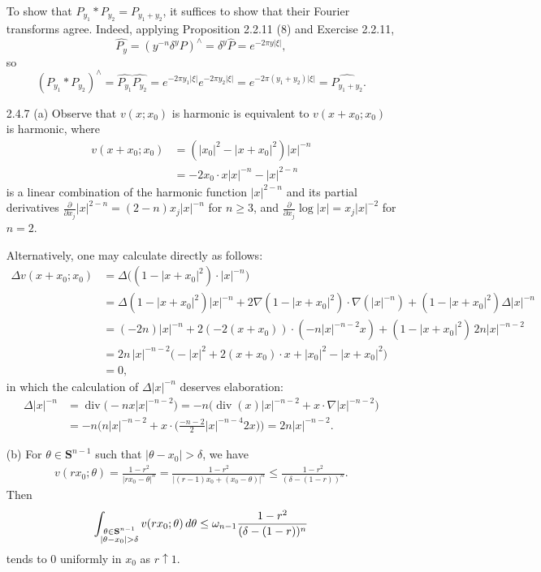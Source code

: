 \begin{itemize}
To show that $P_{y_1}*P_{y_2}=P_{y_1+y_2}$, 
it suffices to show that their Fourier transforms agree. 
Indeed, applying Proposition 2.2.11 (8) and Exercise 2.2.11, 
$$\widehat{P_y}=(y^{-n}\delta^y P)^\wedge=\delta^y \widehat{P}=e^{-2\pi y|\xi|},$$
so
$$(P_{y_1}*P_{y_2})^\wedge=\widehat{P_{y_1}}\widehat{P_{y_2}}
=e^{-2\pi y_1|\xi|}e^{-2\pi y_2|\xi|}=e^{-2\pi (y_1+y_2)|\xi|}
=\widehat{P_{y_1+y_2}}.$$

\item[2.4.7]
(a) Observe that $v(x;x_0)$ is harmonic is equivalent to 
$v(x+x_0;x_0)$ is harmonic, where
\begin{align*}
    v(x+x_0;x_0)&=(|x_0|^2-|x+x_0|^2)|x|^{-n}\\
    &=-2x_0\cdot x|x|^{-n}-|x|^{2-n}
\end{align*}
is a linear combination of the harmonic function $|x|^{2-n}$ and 
its partial derivatives $\frac{\partial}{\partial x_j}|x|^{2-n}=(2-n)x_j|x|^{-n}$ 
for $n\geq3$, and $\frac{\partial}{\partial x_j}\log|x|=x_j|x|^{-2}$ for $n=2$.

Alternatively, one may calculate directly as follows:
\begin{align*}
    \Delta v(x+x_0;x_0)
    &=\Delta\big((1-|x+x_0|^2)\cdot|x|^{-n}\big)\\
    &=\Delta(1-|x+x_0|^2)|x|^{-n}+2\nabla(1-|x+x_0|^2)\cdot\nabla(|x|^{-n})
    +(1-|x+x_0|^2)\Delta|x|^{-n}\\
    &=(-2n)|x|^{-n}+2(-2(x+x_0))\cdot(-n|x|^{-n-2}x)
    +(1-|x+x_0|^2)\,2n|x|^{-n-2}\\
    &=2n\,|x|^{-n-2}\big(\!-|x|^2+2(x+x_0)\cdot x+|x_0|^2-|x+x_0|^2\big)\\
    &=0,
\end{align*}
in which the calculation of $\Delta|x|^{-n}$ deserves elaboration:
\begin{align*}
    \Delta|x|^{-n}
    &=\operatorname{div}\big(\!-\!nx|x|^{-n-2}\big)
    =-n\big(\operatorname{div}(x)|x|^{-n-2}+x\cdot\nabla|x|^{-n-2}\big)\\
    &=-n\Big(n|x|^{-n-2}+x\cdot\Big(\frac{-n-2}{2}|x|^{-n-4}2x\Big)\Big)
    =2n|x|^{-n-2}.
\end{align*}

(b) For $\theta\in\mathbf{S}^{n-1}$ such that $|\theta-x_0|>\delta$, we have
\begin{align*}
    v(rx_0;\theta)=\frac{1-r^2}{|rx_0-\theta|^n}
    =\frac{1-r^2}{|(r-1)x_0+(x_0-\theta)|^n}
    \leq\frac{1-r^2}{(\delta-(1-r))^n}.
\end{align*}
Then
\begin{align*}
\int_{\begin{subarray}{c}
\theta\in\mathbf{S}^{n-1} \\ |\theta-x_0|>\delta 
\end{subarray}}v(rx_0;\theta)\,d\theta
\leq\omega_{n-1}\frac{1-r^2}{(\delta-(1-r))^n}
\end{align*}
tends to $0$ uniformly in $x_0$ as $r\uparrow1$.


\end{itemize}
